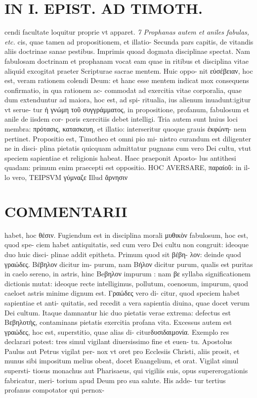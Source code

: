 \documentclass{article}
\begin{document}
\begin{pages}
\section*{IN I. EPIST. AD TIMOTH. }
\marginpar{[ p.95 ]}\pstart cendi facultate loquitur proprie vt apparet.  \pend
\textit{7 Prophanas autem et aniles fabulas, etc. }\pstart cis, quae tamen ad propositionem, et illatio- Secunda pars capitis, de vitandis aliis doctrinae sanae pestibus. Imprimis quoad dogmata disciplinae spectat. Nam fabulosam doctrinam et prophanam vocat eam quae in ritibus et disciplina vitae aliquid excogitat praeter Scripturae sacrae mentem. Huic oppo- nit εὐσέβειαν, hoc est, veram rationem colendi Deum: et hanc esse mentem indicat mox consequens confirmatio, in qua rationem ac- commodat ad exercitia vitae corporalia, quae dum extenduntur ad maiora, hoc est, ad spi- ritualia, ius alienum inuadunt:igitur vt serue- tur ἡ γνώμη τοῦ συγγράμματος, in propositione, profanum, fabulosum et anile de iisdem cor- poris exercitiis debet intelligi. Tria autem sunt huius loci membra: πρότασις, κατασκευη, et illatio: interseritur quoque grauis ἐκφώνη- nem pertinet.  \pend\pstart Propositio est, Timotheo et omni pio mi- nistro curandum est diligenter ne in disci- plina pietatis quicquam admittatur pugnans cum vero Dei cultu, vtut speciem sapientiae et religionis habeat. Haec praeponit Aposto- lus antithesi quadam: primum enim praecepti est oppositio. HOC AVERSARE, παραίοῦ: in il- lo vero, TEIPSVM γύμναζε Illud ἄρνησιν  \pend
\marginpar{[ p.96 ]}
\section*{COMMENTARII }\pstart habet, hoc θέσιν. Fugiendum est in disciplina morali μυθικὸν fabulosum, hoc est, quod spe- ciem habet antiquitatis, sed cum vero Dei cultu non congruit: ideoque duo huic disci- plinae addit epitheta. Primum quod sit βέβη- λον: deinde quod γραώδες. Βέβηλον dicitur im- purum, nam Βήλον dicitur purum, qualis est puritas in caelo sereno, in astris, hinc Beβηλον impurum : nam βε syllaba significationem dictionis mutat: ideoque recte intelligimus, pollutum, coenosum, impurum, quod caeloet astris minime dignum est. Γραώδες vero di- citur, quod speciem habet sapientiae et anti- quitatis, sed recedit a vera sapientia diuina, quae docet verum Dei cultum.  \pend\pstart Itaque damnantur hic duo pietatis verae extrema: defectus est Bεβηλοτὴς, contaminans pietatis exercitia profana vita. Excessus autem est γραώδες, hoc est, superstitio, quae alias di- citurδυσιδαιμονία. Exemplo res declarari potest: tres simul vigilant diuersissimo fine et euen- tu. Apostolus Paulus aut Petrus vigilat per- nox vt oret pro Ecclesiis Christi, aliis prosit, et munus sibi impositum melius obeat, docet Euangelium, et orat. Vigilat simul supersti- tiosus monachus aut Pharisaeus, qui vigiliis suis, opus supererogationis fabricatur, meri- torium apud Deum pro sua salute. His adde- tur tertius profanus compotator qui pernox-  \pend

\end{pages}
\end{document}
